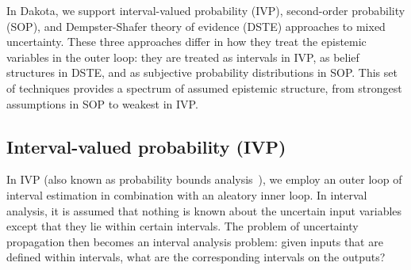 In Dakota, we support interval-valued probability (IVP), second-order
probability (SOP), and Dempster-Shafer theory of evidence (DSTE)
approaches to mixed uncertainty. These three approaches differ in how
they treat the epistemic variables in the outer loop: they are treated
as intervals in IVP, as belief structures in DSTE, and as subjective
probability distributions in SOP. This set of techniques provides a
spectrum of assumed epistemic structure, from strongest assumptions in
SOP to weakest in IVP.

\subsection{Interval-valued probability (IVP)} \label{adv_models:mixed_uq:ivp}

In IVP (also known as probability bounds
analysis~\cite{Fer06,KaKiVeAj09,Aug07}), we employ an outer loop
of interval estimation in combination with an aleatory inner loop.
In interval analysis, it is assumed that nothing is known
about the uncertain input variables except that they lie within
certain intervals. The problem of uncertainty propagation then
becomes an interval analysis problem: given inputs that are defined
within intervals, what are the corresponding intervals on the outputs?


